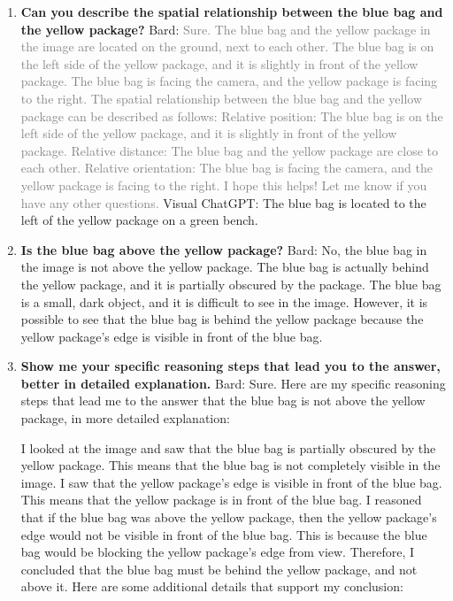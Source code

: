     \begin{enumerate}
        \item \textbf{Can you describe the spatial relationship between the blue bag and the yellow package?}
        \subitem Bard: \textcolor{gray}{
        Sure. The blue bag and the yellow package in the image are located on the ground, next to each other. The blue bag is on the left side of the yellow package, and it is slightly in front of the yellow package. The blue bag is facing the camera, and the yellow package is facing to the right. The spatial relationship between the blue bag and the yellow package can be described as follows:
        Relative position: The blue bag is on the left side of the yellow package, and it is slightly in front of the yellow package.
        Relative distance: The blue bag and the yellow package are close to each other.
        Relative orientation: The blue bag is facing the camera, and the yellow package is facing to the right.
        I hope this helps! Let me know if you have any other questions.}
        \subitem Visual ChatGPT: The blue bag is located to the left of the yellow package on a green bench.
        \item \textbf{Is the blue bag above the yellow package?}
        \subitem Bard: 
        No, the blue bag in the image is not above the yellow package. The blue bag is actually behind the yellow package, and it is partially obscured by the package. The blue bag is a small, dark object, and it is difficult to see in the image. However, it is possible to see that the blue bag is behind the yellow package because the yellow package's edge is visible in front of the blue bag.
        \item \textbf{Show me your specific reasoning steps that lead you to the answer, better in detailed explanation.}
        \subitem Bard: 
        Sure. Here are my specific reasoning steps that lead me to the answer that the blue bag is not above the yellow package, in more detailed explanation:
        
        I looked at the image and saw that the blue bag is partially obscured by the yellow package. This means that the blue bag is not completely visible in the image.
        I saw that the yellow package's edge is visible in front of the blue bag. This means that the yellow package is in front of the blue bag.
        I reasoned that if the blue bag was above the yellow package, then the yellow package's edge would not be visible in front of the blue bag. This is because the blue bag would be blocking the yellow package's edge from view.
        Therefore, I concluded that the blue bag must be behind the yellow package, and not above it.
        Here are some additional details that support my conclusion:
        

\end{enumerate}
